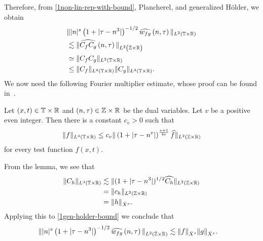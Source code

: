 %
%
%
Therefore, from \eqref{1non-lin-rep-with-bound}, Plancherel, and generalized 
H\"{o}lder, we obtain
%
%
\begin{equation}
	\label{1gen-holder-bound}
	\begin{split}
		& \| |n|^s \left( 1 + | \tau - n^3 | \right )^{-1/2}  \widehat{w_{fg}}\left( 
		n, \tau \right) \|_{L^2(\mathbb{T} \times \mathbb{R})}
		\\
		& \lesssim \|\widehat{C_f C_g }\left( n, \tau \right) 
		\|_{L^2\left( \dot{\mathbb{Z}} \times \mathbb{R} \right)}
		\\
		& \simeq \|C_f C_g \|_{L^2\left( \mathbb{T} \times \mathbb{R} \right)}
		\\
		& \le \|C_f \|_{L^4(\mathbb{T} \times \mathbb{R})} \|C_g \|_{L^4(\mathbb{T} \times \mathbb{R})}.
	\end{split}
\end{equation}
%
We now need the following Fourier multiplier estimate, whose proof can be found
in~\cite{Himonas-Misiolek-2001-A-priori-estimates-for-Schrodinger}.
%
\begin{lemma}
	\label{1lem:four-mult-est-L4}
	Let $(x, t) \in \mathbb{T} \times \mathbb{R} $ and $(n, \tau) \in \mathbb{Z} \times \mathbb{R}$ be 
	the dual variables. Let $v$ be a positive even integer. Then there is a 
	constant $c_v > 0$ such that
%
%
\begin{equation}
	\label{1four-mult-est-L4}
	\begin{split}
		\|f\|_{L^4(\mathbb{T} \times \mathbb{R})} \le c_v \|\left( 1 + | \tau - n^v | 
		\right)^\frac{v+1}{4v} \widehat{f} \|_{L^2( \mathbb{Z} \times \mathbb{R})}
	\end{split}
\end{equation}
for every test function $f(x, t)$. 
%
%
%
%
\end{lemma}
From the lemma, we see that
%
%
\begin{equation}
	\label{1four-mult-conseq}
	\begin{split}
		\|C_h\|_{L^4(\mathbb{T} \times \mathbb{R})} 
		& \lesssim \|(1 + | \tau - n^3 |)^{1/2} \widehat{C_h}
		\|_{L^2(\mathbb{Z} \times \mathbb{R})}
		\\
		& = \|c_{h} \|_{L^2(\mathbb{Z} \times \mathbb{R})} 
		\\
		& = \|h \|_{\dot{X}^s}. 
	\end{split}
\end{equation}
%
%
Applying this to \eqref{1gen-holder-bound} we
conclude that
\begin{equation*}
	\begin{split}
		\| |n|^s \left( 1 + | \tau - n^3 | \right ) ^{-1/2} \widehat{w_{fg}}\left( 
		n, \tau \right) \|_{L^2(\dot{\mathbb{Z}} \times \mathbb{R})}
		& \lesssim \|f\|_{\dot{X}^s} \|g\|_{\dot{X}^s}.
	\end{split}
\end{equation*}
%
%
%
